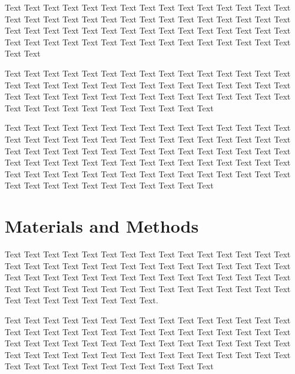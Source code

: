\documentclass{sysbio}%
\begin{document}

Text Text Text Text Text Text Text Text Text Text Text Text Text Text Text Text Text Text Text Text Text Text Text Text Text Text Text Text Text Text Text Text Text Text Text Text Text Text Text Text Text Text Text Text Text Text Text Text Text Text Text Text Text Text Text Text Text Text Text Text Text Text

Text Text Text Text Text Text Text Text Text Text Text Text Text Text Text Text Text Text Text Text Text Text Text Text Text Text Text Text Text Text Text Text Text Text Text Text Text Text Text Text Text Text Text Text Text Text Text Text Text Text Text Text Text Text Text Text%

Text Text Text Text Text Text Text Text Text Text Text Text Text Text Text Text Text Text Text Text Text Text Text Text Text Text Text Text Text Text Text Text Text Text Text Text Text Text Text Text Text Text Text Text Text Text Text Text Text Text Text Text Text Text Text Text Text Text Text Text Text Text Text Text Text Text Text Text Text Text Text Text Text Text Text Text Text Text Text Text Text Text Text Text Text Text

\section{Materials and Methods}\label{sec1}

Text Text Text Text Text Text Text Text Text Text Text Text Text Text Text Text Text Text Text Text Text Text Text Text Text Text Text Text Text Text Text Text Text Text Text Text Text Text Text Text Text Text Text Text Text Text Text Text Text Text Text Text Text Text Text Text Text Text Text Text Text Text Text Text Text Text Text Text.

Text Text Text Text Text Text Text Text Text Text Text Text Text Text Text Text Text Text Text Text Text Text Text Text Text Text Text Text Text Text Text Text Text Text Text Text Text Text Text Text Text Text Text Text Text Text Text Text Text Text Text Text Text Text Text Text Text Text Text Text Text Text Text Text Text Text Text Text Text Text Text
\end{document}
